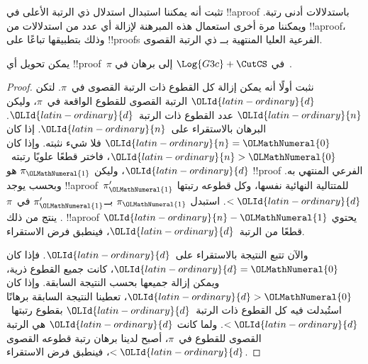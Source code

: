 \documentclass[../../../include/open-logic-section]{subfiles}
\begin{document}


تثبت  أنه يمكننا استبدال استدلال \CutCS{} ذي
الرتبة الأعلى في !!a{proof} باستدلالات \CutCS{} أدنى رتبة. ويمكننا مرة
أخرى استعمال هذه المبرهنة لإزالة أي عدد من استدلالات \CutCS{} من
!!a{proof}، وذلك بتطبيقها تباعًا على !!{proof}s الفرعية العليا المنتهية
بــ\CutCS{} ذي الرتبة القصوى.

\begin{thm}
يمكن تحويل أي !!{proof}~$\pi$ في $\Log{G3c} + \CutCS$ إلى برهان في~.
\end{thm}

\begin{proof}
  نثبت أولًا أنه يمكن إزالة كل القطوع ذات الرتبة القصوى في~$\pi$. لتكن
  ${\OLId{latin-ordinary}{d}}$ الرتبة القصوى للقطوع الواقعة في~$\pi$، وليكن ${\OLId{latin-ordinary}{n}}$ عدد القطوع ذات
  الرتبة~${\OLId{latin-ordinary}{d}}$. البرهان بالاستقراء على~${\OLId{latin-ordinary}{n}}$. إذا كان ${\OLId{latin-ordinary}{n}}={\OLMathNumeral{0}}$ فلا شيء نثبته.
  وإذا كان ${\OLId{latin-ordinary}{n}}>{\OLMathNumeral{0}}$، فاختر قطعًا علويًا رتبته~${\OLId{latin-ordinary}{d}}$، وليكن $\pi_{\OLMathNumeral{1}}$ هو
  !!{proof} الفرعي المنتهي به. وبحسب  يوجد
  !!a{proof}~$\pi_{\OLMathNumeral{1}}'$ للمتتالية النهائية نفسها، وكل قطوعه رتبتها $<{\OLId{latin-ordinary}{d}}$.
  استبدل $\pi_{\OLMathNumeral{1}}$ بــ$\pi_{\OLMathNumeral{1}}'$ في~$\pi$. ينتج من ذلك !!a{proof} يحتوي
  ${\OLId{latin-ordinary}{n}}-{\OLMathNumeral{1}}$ قطعًا من الرتبة~${\OLId{latin-ordinary}{d}}$، فينطبق فرض الاستقراء.

  والآن تتبع النتيجة بالاستقراء على~${\OLId{latin-ordinary}{d}}$. فإذا كان ${\OLId{latin-ordinary}{d}}={\OLMathNumeral{0}}$، كانت جميع القطوع
  ذرية، ويمكن إزالة جميعها بحسب النتيجة السابقة. وإذا كان ${\OLId{latin-ordinary}{d}}>{\OLMathNumeral{0}}$، تعطينا
  النتيجة السابقة برهانًا استُبدلت فيه كل القطوع ذات الرتبة~${\OLId{latin-ordinary}{d}}$ بقطوع
  رتبتها~$<{\OLId{latin-ordinary}{d}}$. ولما كانت ${\OLId{latin-ordinary}{d}}$ هي الرتبة القصوى للقطوع في~$\pi$، أصبح لدينا
  برهان رتبة قطوعه القصوى $<{\OLId{latin-ordinary}{d}}$، فينطبق فرض الاستقراء.
\end{proof}
\end{document}
